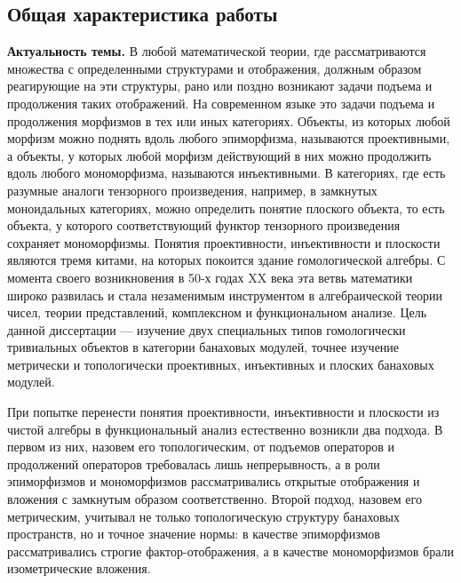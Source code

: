 \subsection*{\Large Общая характеристика работы}
\fontsize{14pt}{15pt}\selectfont

\textbf{Актуальность темы.} В любой математической теории, где рассматриваются множества с определенными структурами и отображения, должным образом реагирующие на эти структуры, рано или поздно возникают задачи подъема и продолжения таких отображений. На современном языке это задачи подъема и продолжения морфизмов в тех или иных категориях. Объекты, из которых любой морфизм можно поднять вдоль любого эпиморфизма, называются проективными, а объекты, у которых любой морфизм действующий в них можно продолжить вдоль любого мономорфизма, называются инъективными. В категориях, где есть разумные аналоги тензорного произведения, например, в замкнутых моноидальных категориях, можно определить понятие плоского объекта, то есть объекта, у которого соответствующий функтор тензорного произведения сохраняет мономорфизмы. Понятия проективности, инъективности и плоскости являются тремя китами, на которых покоится здание гомологической алгебры. С момента своего возникновения в 50-х годах XX века эта ветвь математики широко развилась и стала незаменимым инструментом в алгебраической теории чисел, теории представлений, комплексном и функциональном анализе. Цель данной диссертации --- изучение двух специальных типов гомологически тривиальных объектов в категории банаховых модулей, точнее изучение метрически и топологически проективных, инъективных и плоских банаховых модулей.

При попытке перенести понятия проективности, инъективности и плоскости из чистой алгебры в функциональный анализ естественно возникли два подхода. В первом из них, назовем его топологическим, от подъемов операторов и продолжений операторов требовалась лишь непрерывность, а в роли эпиморфизмов и мономорфизмов рассматривались открытые отображения и вложения с замкнутым образом соответственно. Второй подход, назовем его метрическим, учитывал не только топологическую структуру банаховых пространств, но и точное значение нормы: в качестве эпиморфизмов рассматривались строгие фактор-отображения, а в качестве мономорфизмов брали изометрические вложения. 

